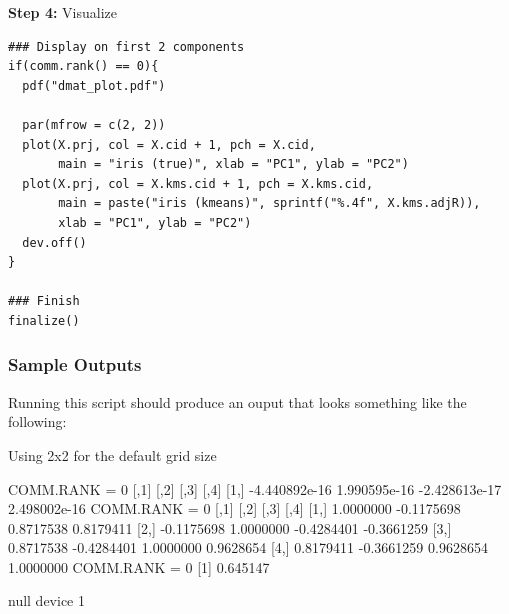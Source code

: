 \textbf{Step 4:}  Visualize\vspace{-.6cm}
\begin{lstlisting}[language=rr]
### Display on first 2 components
if(comm.rank() == 0){
  pdf("dmat_plot.pdf")
  
  par(mfrow = c(2, 2))
  plot(X.prj, col = X.cid + 1, pch = X.cid,
       main = "iris (true)", xlab = "PC1", ylab = "PC2")
  plot(X.prj, col = X.kms.cid + 1, pch = X.kms.cid,
       main = paste("iris (kmeans)", sprintf("%.4f", X.kms.adjR)),
       xlab = "PC1", ylab = "PC2")
  dev.off()
}

### Finish
finalize()
\end{lstlisting}

\subsubsection{Sample Outputs}
Running this script should produce an ouput that looks something like the following:
\begin{Output}
Using 2x2 for the default grid size

COMM.RANK = 0
              [,1]         [,2]          [,3]         [,4]
[1,] -4.440892e-16 1.990595e-16 -2.428613e-17 2.498002e-16
COMM.RANK = 0
           [,1]       [,2]       [,3]       [,4]
[1,]  1.0000000 -0.1175698  0.8717538  0.8179411
[2,] -0.1175698  1.0000000 -0.4284401 -0.3661259
[3,]  0.8717538 -0.4284401  1.0000000  0.9628654
[4,]  0.8179411 -0.3661259  0.9628654  1.0000000
COMM.RANK = 0
[1] 0.645147

null device 
          1 
\end{Output}

